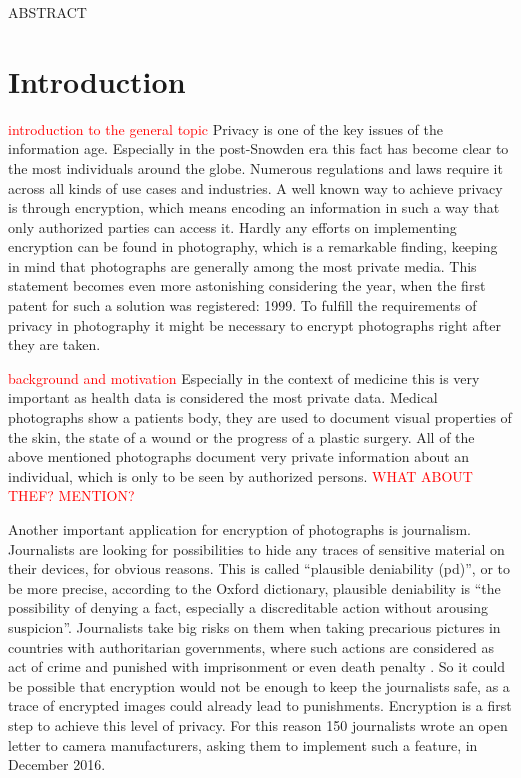 \documentclass[12pt,a4paper,titlepage,oneside]{scrartcl}
\newcommand\todo[1]{\textcolor{red}{#1}}
\begin{document}
\maketitle
\setcounter{section}{0}
\setcounter{tocdepth}{2}
\tableofcontents
\newpage

ABSTRACT

\newpage
\section{Introduction}

\todo{introduction to the general topic}
Privacy is one of the key issues of the information age.
Especially in the post-Snowden era this fact has become clear to the most individuals around the globe. 
Numerous regulations and laws \cite{EHG2015, DSG2000, ELGA2012, EuropeanParliament2016, EuropeanCourtofHumanRights2010} require it across all kinds of use cases and industries.
A well known way to achieve privacy is through encryption, which means encoding an information in such a way that only authorized parties can access it. 
Hardly any efforts on implementing encryption can be found in photography, which is a remarkable finding, keeping in mind that photographs are generally among the most private media.
This statement becomes even more astonishing considering the year, when the first patent for such a solution was registered: 1999. \cite{steinberg1999method}
To fulfill the requirements of privacy in photography it might be necessary to encrypt photographs right after they are taken.

\todo{background and motivation}
Especially in the context of medicine this is very important as health data is considered the most private data. \cite{williams2013}
Medical photographs show a patients body, they are used to document visual properties of the skin, the state of a wound or the progress of a plastic surgery. 
All of the above mentioned photographs document very private information about an individual, which is only to be seen by authorized persons. \todo{WHAT ABOUT THEF? MENTION?}

Another important application for encryption of photographs is journalism.
Journalists are looking for possibilities to hide any traces of sensitive material on their devices, for obvious reasons.
This is called ``plausible deniability (pd)'', or to be more precise, according to the Oxford dictionary, plausible deniability is ``the possibility of denying a fact, especially a discreditable action without arousing suspicion''.\cite{OxforddictPlausibleDen}
Journalists take big risks on them when taking precarious pictures in countries with authoritarian governments, where such actions are considered as act of crime and punished with imprisonment or even death penalty \cite{Amnesty2016}.
So it could be possible that encryption would not be enough to keep the journalists safe, as a trace of encrypted images could already lead to punishments.
Encryption is a first step to achieve this level of privacy.
For this reason 150 journalists wrote an open letter to camera manufacturers, asking them to implement such a feature, in December 2016.\cite{fp2016}
\end{document}
